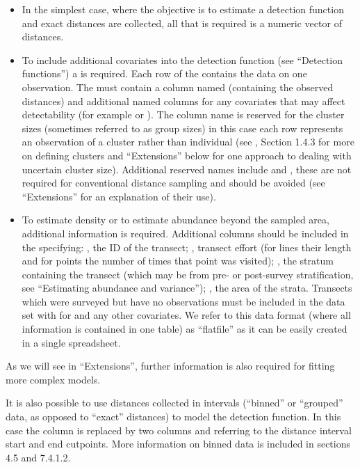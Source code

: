 \documentclass[article]{jss}
\providecommand{\tightlist}{%
  \setlength{\itemsep}{0pt}\setlength{\parskip}{0pt}}
\begin{document}
\begin{itemize}
\tightlist
\item
  In the simplest case, where the objective is to estimate a detection
  function and exact distances are collected, all that is required is a
  numeric vector of distances.
\item
  To include additional covariates into the detection function (see
  ``Detection functions'') a  is required. Each row of
  the  contains the data on one observation. The
   must contain a column named 
  (containing the observed distances) and additional named columns for
  any covariates that may affect detectability (for example
   or ). The column name  is
  reserved for the cluster sizes (sometimes referred to as group sizes)
  in this case each row represents an observation of a cluster rather
  than individual (see \citet{Buckland:2001vm}, Section 1.4.3 for more
  on defining clusters and ``Extensions'' below for one approach to
  dealing with uncertain cluster size). Additional reserved names
  include  and , these are not required for
  conventional distance sampling and should be avoided (see
  ``Extensions'' for an explanation of their use).
\item
  To estimate density or to estimate abundance beyond the sampled area,
  additional information is required. Additional columns should be
  included in the  specifying: , the
  ID of the transect; , transect effort (for lines their
  length and for points the number of times that point was visited);
  , the stratum containing the transect (which may be
  from pre- or post-survey stratification, see ``Estimating abundance
  and variance''); , the area of the strata. Transects which
  were surveyed but have no observations must be included in the data
  set with  for  and any other covariates. We
  refer to this data format (where all information is contained in one
  table) as ``flatfile'' as it can be easily created in a single
  spreadsheet.
\end{itemize}

As we will see in ``Extensions'', further information is also required
for fitting more complex models.

It is also possible to use distances collected in intervals (``binned''
or ``grouped'' data, as opposed to ``exact'' distances) to model the
detection function. In this case the column  is replaced
by two columns  and  referring to the
distance interval start and end cutpoints. More information on binned
data is included in \citet{Buckland:2001vm} sections 4.5 and 7.4.1.2.
\end{document}
